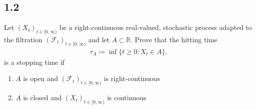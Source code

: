 \subsection*{1.2}
\begin{exercise}
Let $(X_t)_{t \in  [0,\infty)}$ be a right-continuous real-valued, stochastic process adapted to the filtration $(\mathcal{F}_{t})_{t \in  [0,\infty)}$ and 
let $A \subset  \mathbb{R}$. Prove that the hitting time 
\begin{align*}
  \tau_A \coloneqq  \inf \{t\ge 0 : X_t \in  A\}  
.\end{align*}
is a stopping time if 
\begin{enumerate}
  \item $A$ is open and $(\mathcal{F}_{t})_{t \in  [0,\infty)}$  is right-continuous
  \item $A$ is closed and $(X_t)_{t \in  [0,\infty)}$  is continuous
\end{enumerate}  
\end{exercise}
